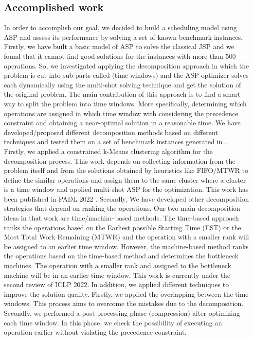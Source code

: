 \documentclass[submission,copyright,creativecommons]{eptcs}
\begin{document}
\subsection{Accomplished work}
In order to accomplish our goal, we decided to build a scheduling model using ASP and assess its performance by solving a set of known benchmark instances. Firstly, we have built a basic model of ASP to solve the classical JSP and we found that it cannot find good solutions for the instances with more than 500 operations. So, we investigated applying the decomposition approach in which the problem is cut into sub-parts called (time windows) and the ASP optimizer solves each dynamically using the multi-shot solving technique \cite{gebser2019multi} and get the solution of the original problem. The main contribution of this approach is to find a smart way to split the problem into time windows. More specifically, determining which operations are assigned in which time window with considering the precedence constraint and obtaining a near-optimal solution in a reasonable time. We have developed/proposed different decomposition methods based on different techniques and tested them on a set of benchmark instances generated in \cite{taillard1993benchmarks,demirkol1998benchmarks}. Firstly, we applied a constrained k-Means clustering algorithm for the decomposition process. This work depends on collecting information from the problem itself and from the solutions obtained by heuristics like FIFO/MTWR to define the similar operations and assign them to the same cluster where a cluster is a time window and applied multi-shot ASP for the optimization. This work has been published in PADL 2022 \cite{el2022decomposition}. 
Secondly, We have developed other decomposition strategies that depend on ranking the operations. Our two main decomposition ideas in that work are time/machine-based methods. The time-based approach ranks the operations based on the Earliest possible Starting Time (EST) or the Most Total Work Remaining (MTWR) and the operation with a smaller rank will be assigned to an earlier time window. However, the machine-based method ranks the operations based on the time-based method and determines the bottleneck machines. The operation with a smaller rank and assigned to the bottleneck machine will be in an earlier time window. This work is currently under the second review of ICLP 2022. In addition, we applied different techniques to improve the solution quality. Firstly, we applied the overlapping between the time windows. This process aims to overcome the mistakes due to the decomposition. Secondly, we performed a post-processing phase (compression) after optimizing each time window. In this phase, we check the possibility of executing an operation earlier without violating the precedence constraint. 
\end{document}
